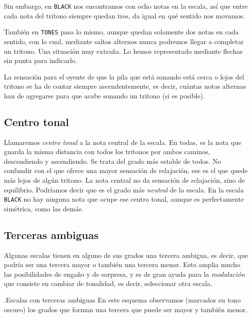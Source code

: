 \documentclass[]{article}
\begin{document}
Sin embargo, en \texttt{BLACK} nos encontramos con ocho notas en la escala, así que entre cada nota del tritono siempre quedan tres, da igual en qué sentido nos movamos.

También en \texttt{TONES} pasa lo mismo, aunque quedan solamente dos notas en cada sentido, con lo cual, mediante saltos alternos nunca podremos llegar a completar un tritono. Una situación muy extraña. Lo hemos representado mediante flechas sin punta para indicarlo.

La sensación para el oyente de que la pila que está sonando está cerca o lejos del tritono se ha de contar siempre ascendentemente, es decir, cuántas notas alternas han de agregarse para que acabe sonando un tritono (si es posible).

\subsection{Centro tonal}

Llamaremos \emph{centro tonal} a la nota central de la escala. En todas, es la nota que guarda la misma distancia con todos los tritonos por ambos caminos, descendiendo y ascendiendo. Se trata del grado más estable de todos. No confundir con el que ofrece una mayor sensación de relajación, ese es el que quede más lejos de algún tritono. La nota central no da sensación de relajación, sino de equilibrio. Podríamos decir que es el grado más \emph{neutral} de la escala. En la escala \texttt{BLACK} no hay ninguna nota que ocupe ese centro tonal, aunque es perfectamente simétrica, como las demás.

\subsection{Terceras ambiguas}

Algunas escalas tienen en alguno de sus grados una tercera ambigua, es decir, que podría ser una tercera mayor o también una tercera menor. Esto amplia mucho las posibilidades de engaño y de sorpresa, y es de gran ayuda para la \emph{modulación} que consiste en cambiar de tonalidad, es decir, seleccionar otra escala.

.Escalas con terceras ambiguas En este esquema observamos (marcados en tono oscuro) los grados que forman una tercera que puede ser mayor y también menor.
\end{document}
